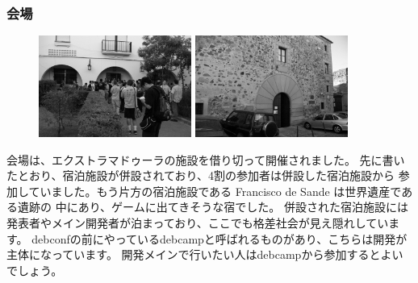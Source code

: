 \documentclass[mingoth,a4paper]{jsarticle}
\begin{document}
\subsubsection{会場}

\begin{figure}
  \includegraphics[width=5cm]{image200908/debconf9_venue_mono.jpg}
  \includegraphics[width=5cm]{image200908/debconf9-fds_mono.jpg}
\end{figure}
  会場は、エクストラマドゥーラの施設を借り切って開催されました。
  先に書いたとおり、宿泊施設が併設されており、4割の参加者は併設した宿泊施設から
  参加していました。もう片方の宿泊施設である Francisco de Sande は世界遺産である遺跡の
  中にあり、ゲームに出てきそうな宿でした。
  併設された宿泊施設には発表者やメイン開発者が泊まっており、ここでも格差社会が見え隠れしています。
  debconfの前にやっているdebcampと呼ばれるものがあり、こちらは開発が主体になっています。
  開発メインで行いたい人はdebcampから参加するとよいでしょう。
  \\
\end{document}

